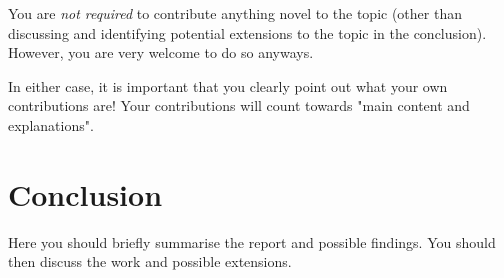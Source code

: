 \documentclass[a4paper,11pt]{article}
\theoremstyle{definition}
\begin{document}
You are \emph{not required} to contribute anything novel to the topic (other than discussing and identifying potential extensions to the topic in the conclusion). However, you are very welcome to do so anyways. 

In either case, it is important that you clearly point out what your own contributions are! Your contributions will count towards "main content and explanations".

\section{Conclusion}
Here you should briefly summarise the report and possible findings. 
You should then discuss the work and possible extensions.


\end{document}
